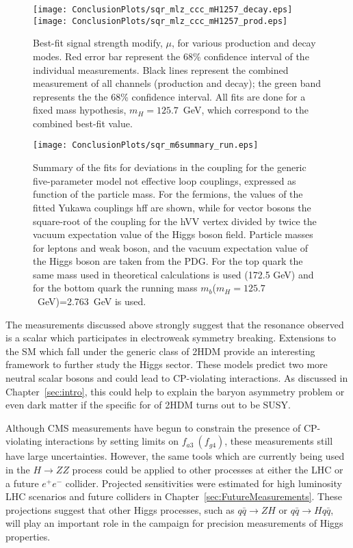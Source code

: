 \begin{figure}
\begin{center}
\texttt{[image: ConclusionPlots/sqr\_mlz\_ccc\_mH1257\_decay.eps]}
\texttt{[image: ConclusionPlots/sqr\_mlz\_ccc\_mH1257\_prod.eps]}
\caption{Best-fit signal strength modify, $\mu$, for various 
production and decay modes.  Red error bar represent the 68\%
confidence interval of the individual measurements.  Black lines
represent the combined measurement of all channels (production and
decay); the green band represents the the 68\% confidence interval.
All fits are done for a fixed mass hypothesis, $m_H=125.7$~GeV, 
which correspond to the combined best-fit value.}
\label{fig:crossSectionsByChannel}
\end{center}
\end{figure}

\begin{figure}
\begin{center}
\texttt{[image: ConclusionPlots/sqr\_m6summary\_run.eps]}
\caption{Summary of the fits for deviations in the coupling for the generic five-parameter model not effective loop couplings, expressed as function of the particle mass. For the fermions, the values of the fitted Yukawa couplings hff are shown, while for vector bosons the square-root of the coupling for the hVV vertex divided by twice the vacuum expectation value of the Higgs boson field. Particle masses for leptons and weak boson, and the vacuum expectation value of the Higgs boson are taken from the PDG. For the top quark the same mass used in theoretical calculations is used (172.5 GeV) and for the bottom quark the running mass $m_b$($m_H=125.7$~GeV)=2.763~GeV is used.}
\label{fig:couplingMeasurements}
\end{center}
\end{figure}

The measurements discussed above strongly suggest that the 
resonance observed is a scalar which participates in
electroweak symmetry breaking.  Extensions to the SM which 
fall under the generic class of 2HDM provide an interesting
framework to further study the Higgs sector.  These models
predict two more neutral scalar bosons and could lead to 
CP-violating interactions.  As discussed in Chapter~\ref{sec:intro},
this could help to explain the baryon asymmetry problem
or even dark matter if the specific for of 2HDM turns out
to be SUSY.

Although CMS measurements have begun to constrain the presence
of CP-violating interactions by setting limits on $f_{a3}~(f_{g4})$, 
these measurements still have large uncertainties.  However, 
the same tools which are currently being used in the $H\to ZZ$ 
process could be applied to other processes at either the LHC or a
future $e^+e^-$ collider.    Projected sensitivities were
estimated for high luminosity LHC scenarios
and future colliders in Chapter~\ref{sec:FutureMeasurements}.
These projections suggest that other Higgs processes, such as 
$q\bar{q}\to ZH$ or $q\bar{q}\to Hq\bar{q}$, will play 
an important role in the campaign for precision measurements
of Higgs properties.   

